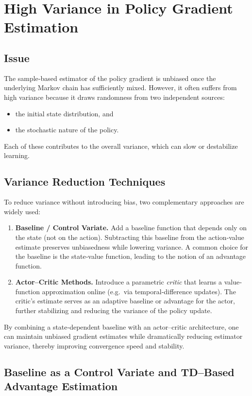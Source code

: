 \section{High Variance in Policy Gradient Estimation}

\subsection{Issue}
The sample‐based estimator of the policy gradient is unbiased once the underlying Markov chain has sufficiently mixed. However, it often suffers from high variance because it draws randomness from two independent sources:
\begin{itemize}
  \item the initial state distribution, and
  \item the stochastic nature of the policy.
\end{itemize}
Each of these contributes to the overall variance, which can slow or destabilize learning.

\subsection{Variance Reduction Techniques}
To reduce variance without introducing bias, two complementary approaches are widely used:

\begin{enumerate}
  \item \textbf{Baseline / Control Variate.}  
    Add a baseline function that depends only on the state (not on the action).  
    Subtracting this baseline from the action‐value estimate preserves unbiasedness while lowering variance.  
    A common choice for the baseline is the state‐value function, leading to the notion of an advantage function.

  \item \textbf{Actor–Critic Methods.}  
    Introduce a parametric \emph{critic} that learns a value‐function approximation online (e.g.\ via temporal‐difference updates).  
    The critic’s estimate serves as an adaptive baseline or advantage for the actor, further stabilizing and reducing the variance of the policy update.
\end{enumerate}

By combining a state‐dependent baseline with an actor–critic architecture, one can maintain unbiased gradient estimates while dramatically reducing estimator variance, thereby improving convergence speed and stability.
\subsection{Baseline as a Control Variate and TD–Based Advantage Estimation}

